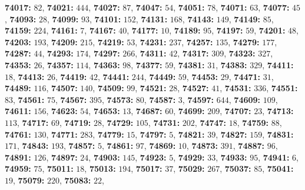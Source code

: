 \textsf{\bfseries 74017:} $82$, \textsf{\bfseries 74021:} $444$, \textsf{\bfseries 74027:} $87$, \textsf{\bfseries 74047:} $54$, \textsf{\bfseries 74051:} $78$, \textsf{\bfseries 74071:} $63$, \textsf{\bfseries 74077:} $45$, \textsf{\bfseries 74093:} $28$, \textsf{\bfseries 74099:} $93$, \textsf{\bfseries 74101:} $152$, \textsf{\bfseries 74131:} $168$, \textsf{\bfseries 74143:} $149$, \textsf{\bfseries 74149:} $85$, \textsf{\bfseries 74159:} $224$, \textsf{\bfseries 74161:} $7$, \textsf{\bfseries 74167:} $40$, \textsf{\bfseries 74177:} $10$, \textsf{\bfseries 74189:} $95$, \textsf{\bfseries 74197:} $59$, \textsf{\bfseries 74201:} $48$, \textsf{\bfseries 74203:} $193$, \textsf{\bfseries 74209:} $215$, \textsf{\bfseries 74219:} $53$, \textsf{\bfseries 74231:} $237$, \textsf{\bfseries 74257:} $135$, \textsf{\bfseries 74279:} $177$, \textsf{\bfseries 74287:} $44$, \textsf{\bfseries 74293:} $174$, \textsf{\bfseries 74297:} $266$, \textsf{\bfseries 74311:} $42$, \textsf{\bfseries 74317:} $309$, \textsf{\bfseries 74323:} $327$, \textsf{\bfseries 74353:} $26$, \textsf{\bfseries 74357:} $114$, \textsf{\bfseries 74363:} $98$, \textsf{\bfseries 74377:} $59$, \textsf{\bfseries 74381:} $31$, \textsf{\bfseries 74383:} $329$, \textsf{\bfseries 74411:} $18$, \textsf{\bfseries 74413:} $26$, \textsf{\bfseries 74419:} $42$, \textsf{\bfseries 74441:} $244$, \textsf{\bfseries 74449:} $59$, \textsf{\bfseries 74453:} $29$, \textsf{\bfseries 74471:} $31$, \textsf{\bfseries 74489:} $116$, \textsf{\bfseries 74507:} $140$, \textsf{\bfseries 74509:} $99$, \textsf{\bfseries 74521:} $28$, \textsf{\bfseries 74527:} $41$, \textsf{\bfseries 74531:} $336$, \textsf{\bfseries 74551:} $83$, \textsf{\bfseries 74561:} $75$, \textsf{\bfseries 74567:} $395$, \textsf{\bfseries 74573:} $80$, \textsf{\bfseries 74587:} $3$, \textsf{\bfseries 74597:} $644$, \textsf{\bfseries 74609:} $109$, \textsf{\bfseries 74611:} $156$, \textsf{\bfseries 74623:} $54$, \textsf{\bfseries 74653:} $13$, \textsf{\bfseries 74687:} $60$, \textsf{\bfseries 74699:} $209$, \textsf{\bfseries 74707:} $23$, \textsf{\bfseries 74713:} $113$, \textsf{\bfseries 74717:} $69$, \textsf{\bfseries 74719:} $28$, \textsf{\bfseries 74729:} $105$, \textsf{\bfseries 74731:} $202$, \textsf{\bfseries 74747:} $18$, \textsf{\bfseries 74759:} $88$, \textsf{\bfseries 74761:} $130$, \textsf{\bfseries 74771:} $283$, \textsf{\bfseries 74779:} $15$, \textsf{\bfseries 74797:} $5$, \textsf{\bfseries 74821:} $39$, \textsf{\bfseries 74827:} $159$, \textsf{\bfseries 74831:} $171$, \textsf{\bfseries 74843:} $193$, \textsf{\bfseries 74857:} $5$, \textsf{\bfseries 74861:} $97$, \textsf{\bfseries 74869:} $10$, \textsf{\bfseries 74873:} $391$, \textsf{\bfseries 74887:} $96$, \textsf{\bfseries 74891:} $126$, \textsf{\bfseries 74897:} $24$, \textsf{\bfseries 74903:} $145$, \textsf{\bfseries 74923:} $5$, \textsf{\bfseries 74929:} $33$, \textsf{\bfseries 74933:} $95$, \textsf{\bfseries 74941:} $6$, \textsf{\bfseries 74959:} $75$, \textsf{\bfseries 75011:} $18$, \textsf{\bfseries 75013:} $194$, \textsf{\bfseries 75017:} $37$, \textsf{\bfseries 75029:} $267$, \textsf{\bfseries 75037:} $85$, \textsf{\bfseries 75041:} $19$, \textsf{\bfseries 75079:} $220$, \textsf{\bfseries 75083:} $22$, 
